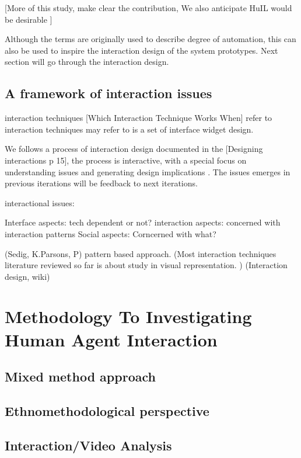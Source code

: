[More of this study, make clear the contribution, We also anticipate HuIL would be desirable ]

Although the terms are originally used to describe degree of automation, this can also be used to inspire the interaction design of the system prototypes. Next section will go through the interaction design.



\section{A framework of interaction issues}
interaction techniques 
[Which Interaction Technique Works When] refer to interaction techniques may refer to is a set of interface widget design.


We follows a process of interaction design documented in the [Designing interactions p 15], the process is interactive, with a special focus on understanding issues and generating design implications . The issues emerges in previous iterations will be feedback to next iterations. 

interactional issues: 

Interface aspects: tech dependent or not?
interaction aspects: concerned with interaction patterns 
Social aspects: Corncerned with what? 

(Sedig, K.Parsons, P) pattern based approach.
(Most interaction techniques literature reviewed so far is about study in visual representation. )
(Interaction design, wiki)




\chapter{ Methodology To Investigating Human Agent Interaction}

\section{ Mixed method approach }

\section{ Ethnomethodological perspective }

\section{ Interaction/Video Analysis}



